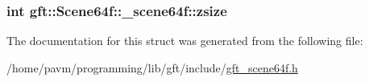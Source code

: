 \hypertarget{structgft_1_1Scene64f_1_1__scene64f_a1246232c6a1828badcc862f6dc3259a9}{
\subsubsection[{zsize}]{\setlength{\rightskip}{0pt plus 5cm}int gft\-::\-Scene64f\-::\-\_\-scene64f\-::zsize}}\label{structgft_1_1Scene64f_1_1__scene64f_a1246232c6a1828badcc862f6dc3259a9}


The documentation for this struct was generated from the following file\-:\begin{DoxyCompactItemize}
\item 
/home/pavm/programming/lib/gft/include/\hyperlink{gft__scene64f_8h}{gft\-\_\-scene64f.\-h}\end{DoxyCompactItemize}
